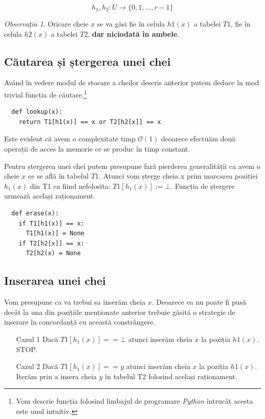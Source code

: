 \documentclass[a4paper]{article}
\theoremstyle{remark}
\newtheorem{remark}{Observa\c{t}ia}
\theoremstyle{definition}
\begin{document}
\[h_1, h_2: U \to \{0, 1, ..., r-1\}\]

\begin{remark}
Oricare cheie $x$ se va găsi fie în celula $h1(x)$ a tabelei $T1$, fie în celula $h2(x)$ a tabelei $T2$, \textbf{dar niciodată în ambele}.
\end{remark}

\subsection{Căutarea și ștergerea unei chei}

Având în vedere modul de stocare a cheilor descris anterior putem deduce în mod trivial funcția de căutare.\footnote{Vom descrie funcția folosind limbajul de programare \textit{Python} întrucât acesta este unul intuitiv.}

\begin{verbatim}
  def lookup(x):
   	return T1[h1(x)] == x or T2[h2[x]] == x
\end{verbatim}

Este evident că avem o complexitate timp $\mathcal{O}(1)$ deoarece efectuăm două operații de acces la memorie ce se produc în timp constant.

Pentru ștergerea unei chei putem presupune fară pierderea generalității ca avem o cheie $x$ ce se află în tabelul $T1$. Atunci vom șterge cheia x prim marcarea poziției $h_1(x)$ din T1 ca fiind nefolosita: $T1[h_1(x)] := \bot$. Funcția de ștergere urmează același raționament.

\begin{verbatim}
  def erase(x):
    if T1[h1(x)] == x:
   	  T1[h1(x)] = None
   	if T2[h2[x]] == x:
   	  T2[h2(x) = None
\end{verbatim}

\subsection{Inserarea unei chei}

Vom presupune ca va trebui sa inserăm cheia $x$. Deoarece ea nu poate fi pusă decât la una din pozițiile menționate anterior trebuie găsită o strategie de inserare în concordanță cu această constrângere.

\begin{itemize}
  \item[Cazul 1] Dacă $T1[h_1(x)] == \bot$ atunci inserăm cheia $x$ la poziția $h1(x)$. STOP.
  \item[Cazul 2] Dacă $T1[h_1(x)] == y$ atunci inserăm cheia $x$ la poziția $h1(x)$. Iterăm prin a insera cheia $y$ în tabelul T2 folosind același raționament.
\end{itemize}
\end{document}
